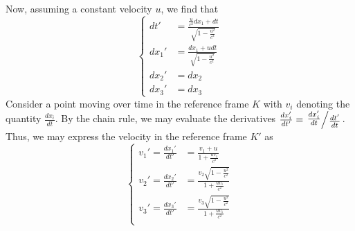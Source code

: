 \documentclass{article}
\newcommand{\bigslant}[2]{\left.\raisebox{.1em}{$#1$}\middle/\raisebox{-.15em}{$#2$}\right.}
\begin{document}
Now, assuming a constant velocity $u$, we find that
\[\left\{\begin{aligned}
    dt'&=\frac{\frac{u}{c^2}dx_1 + dt}{\sqrt{1-\frac{u^2}{c^2}}}\\
    dx_1'&=\frac{dx_1+ udt}{\sqrt{1-\frac{u^2}{c^2}}}\\
    dx_2'&= dx_2\\
    dx_3'&= dx_3
\end{aligned}\right.\]
Consider a point moving over time in the reference frame $K$ with $v_i$ denoting the quantity $\frac{dx_i}{dt}$. By the chain rule, we may evaluate the derivatives $\frac{dx_i'}{dt'} = \bigslant{\frac{dx_i'}{dt}}{\frac{dt'}{dt}}$. Thus, we may express the velocity in the reference frame $K'$ as
\[\left\{\begin{aligned}
    v_1' = \frac{dx_1'}{dt'}&=\frac{v_1+u}{1+\frac{uv_1}{c^2}}\\
    v_2' = \frac{dx_2'}{dt'}&=\frac{v_2\sqrt{1-\frac{u^2}{c^2}}}{1+\frac{uv_1}{c^2}}\\
    v_3' = \frac{dx_3'}{dt'}&=\frac{v_3\sqrt{1-\frac{u^2}{c^2}}}{1+\frac{uv_1}{c^2}}\\
\end{aligned}\right.\]
\end{document}
